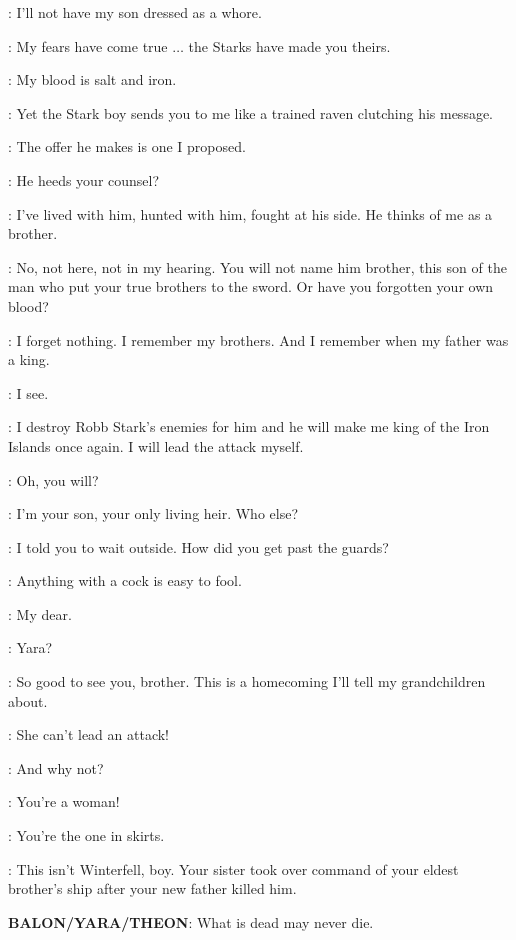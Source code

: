 \BALON: I'll not have my son dressed as a whore.


\BALON: My fears have come true $\ldots$ the Starks have made you theirs.

\THEON: My blood is salt and iron.

\BALON: Yet the Stark boy sends you to me like a trained raven clutching his message.

\THEON: The offer he makes is one I proposed.

\BALON: He heeds your counsel?

\THEON: I've lived with him, hunted with him, fought at his side. He thinks of me as a brother.

\BALON: No, not here, not in my hearing. You will not name him brother, this son of the man who put your true brothers to the sword. Or have you forgotten your own blood?

\THEON: I forget nothing. I remember my brothers. And I remember when my father was a king.

\BALON: I see.

\THEON: I destroy Robb Stark's enemies for him and he will make me king of the Iron Islands once again. I will lead the attack myself.

\BALON: Oh, you will?

\THEON: I'm your son, your only living heir. Who else?


\THEON: I told you to wait outside. How did you get past the guards?

\YARA: Anything with a cock is easy to fool.

\BALON: My dear.

\THEON: Yara?

\YARA: So good to see you, brother. This is a homecoming I'll tell my grandchildren about.

\THEON: She can't lead an attack!

\BALON: And why not?

\THEON: You're a woman!

\YARA: You're the one in skirts.

\BALON: This isn't Winterfell, boy. Your sister took over command of your eldest brother's ship after your new father killed him.

\textbf{BALON/YARA/THEON}:  What is dead may never die.

